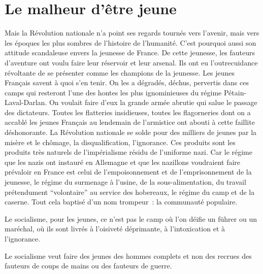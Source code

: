 \documentclass[french,twoside]{book} %
\begin{document}
\section[Le malheur d’être jeune]{Le malheur d’être jeune}
\noindent Mais la Révolution nationale n’a point ses regards tournés vers l’avenir, mais vers les époques les plus sombres de l’histoire de l’humanité. C’est pourquoi aussi son attitude scandaleuse envers la jeunesse de France. De cette jeunesse, les fauteurs d’aventure ont voulu faire leur réservoir et leur arsenal. Ils ont eu l’outrecuidance révoltante de se présenter comme les champions de la jeunesse. Les jeunes Français savent à quoi s’en tenir. On les a dégradés, déchus, pervertis dans ces camps qui resteront l’une des hontes les plus ignominieuses du régime Pétain-Laval-Darlan. On voulait faire d’eux la grande armée abrutie qui salue le passage des dictateurs. Toutes les flatteries insidieuses, toutes les flagorneries dont on a accablé les jeunes Français au lendemain de l’armistice ont abouti à cette faillite déshonorante. La Révolution nationale se solde pour des milliers de jeunes par la misère et le chômage, la disqualification, l’ignorance. Ces produits sont les produits très naturels de l’impérialisme résidu de l’uniforme nazi. Car le régime que les nazis ont instauré en Allemagne et que les nazillons voudraient faire prévaloir en France est celui de l’empoisonnement et de l’emprisonnement de la jeunesse, le régime du surmenage à l’usine, de la sous-alimentation, du travail prétendument “volontaire” au service des hobereaux, le régime du camp   et de la caserne. Tout cela baptisé d’un nom trompeur : la communauté populaire.\par
Le socialisme, pour les jeunes, ce n’est pas le camp où l’on déifie un führer ou un maréchal, où ils sont livrés à l’oisiveté déprimante, à l’intoxication et à l’ignorance.\par
Le socialisme veut faire des jeunes des hommes complets et non des recrues des fauteurs de coups de mains ou des fauteurs de guerre.
\end{document}
